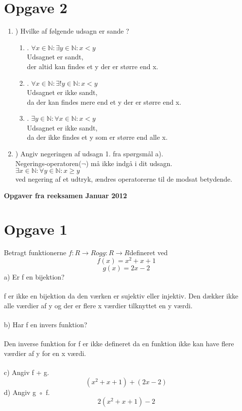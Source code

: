 \documentclass[a4paper,12pt]{article}
\begin{document}
\section{Opgave 2}
\renewcommand{\labelenumi}{\alph{enumi}}
\renewcommand{\labelenumii}{\arabic{enumii}}
\begin{enumerate}
	\item) Hvilke af følgende udsagn er sande ?
\begin{enumerate}
	\item. \( \forall x \in  \mathbb{N}: \exists y \in \mathbb{N}: x < y\)\\

	Udsagnet er sandt,\\
	der altid kan findes et y der er større end x.\\
	
	\item. \(\forall x \in \mathbb{N}:\exists! y \in \mathbb{N}: x < y\)\\
	
	Udsagnet er ikke sandt,\\
	da der kan findes mere end et y der er større end x.\\
	
	\item. \( \exists y \in \mathbb{N}: \forall x \in \mathbb{N}: x < y\)\\
	
	Udsagnet er ikke sandt,\\
	da der ikke findes et y som er større end alle x.\\
	
\end{enumerate}
	\item) Angiv negeringen af udsagn 1. fra spørgsmål a).\\
	Negerings-operatoren($\neg$) må ikke indgå i dit udsagn.\\
	
	\(\exists x \in \mathbb{N}: \forall y \in \mathbb{N}: x \geq y\)\\
	ved negering af et udtryk, ændres operatorerne til de modsat betydende.
	
\end{enumerate}

\textbf{Opgaver fra reeksamen Januar 2012}
\section{Opgave 1}
Betragt funktionerne $f : R → R og g : R → R $defineret ved
$$f(x) = x^2 + x + 1$$
$$g(x) = 2x - 2$$
a) Er f en bijektion?  \\\\
f er ikke en bijektion da den værken er sujektiv eller injektiv. Den dækker ikke alle værdier af y og der er flere x værdier tilknyttet en y værdi.
\\
\\
b) Har f en invers funktion?
\\
\\
Den inverse funktion for f er ikke defineret da en funktion ikke kan have flere værdier af y for en x værdi.
\\
\\
c) Angiv f + g.
$$(x^2 + x + 1) + (2x-2)$$
d) Angiv g ◦ f.
$$2(x^2+x+1) - 2$$
\end{document}
